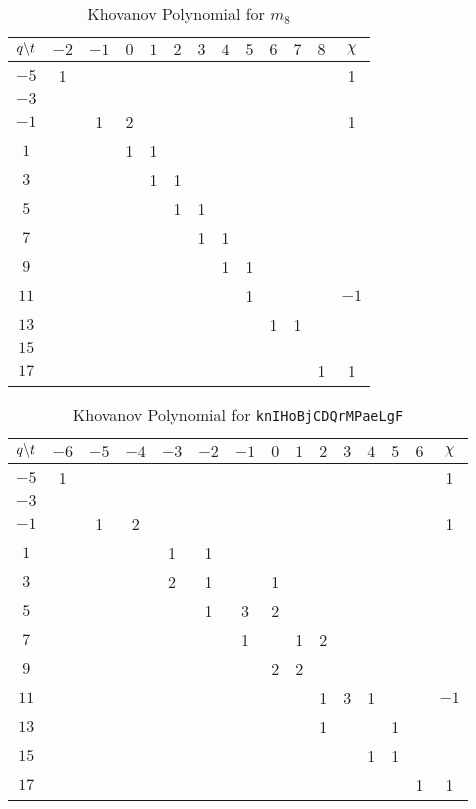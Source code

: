     \begin{table}
        \centering
        \begin{tabular}{| c | c | c | c | c | c | c | c | c | c | c | c | c |}
            \hline
            $q\symbol{92}t$&$-2$&$-1$&$0$&$1$&$2$&$3$&$4$&$5$&$6$&$7$&$8$&$\chi$\\
            \hline
            $-5$&1&&&&&&&&&&&1\\
            \hline
            $-3$&&&&&&&&&&&&\\
            \hline
            $-1$&&1&2&&&&&&&&&1\\
            \hline
            $1$&&&1&1&&&&&&&&\\
            \hline
            $3$&&&&1&1&&&&&&&\\
            \hline
            $5$&&&&&1&1&&&&&&\\
            \hline
            $7$&&&&&&1&1&&&&&\\
            \hline
            $9$&&&&&&&1&1&&&&\\
            \hline
            $11$&&&&&&&&1&&&&$-1$\\
            \hline
            $13$&&&&&&&&&1&1&&\\
            \hline
            $15$&&&&&&&&&&&&\\
            \hline
            $17$&&&&&&&&&&&1&1\\
            \hline
        \end{tabular}
        \caption{Khovanov Polynomial for $m_{8}$}
        \label{table:m_8_kho}
    \end{table}
    \begin{table}
        \centering
        \begin{tabular}{| c | c | c | c | c | c | c | c | c | c | c | c | c | c | c |}
            \hline
            $q\symbol{92}t$&$-6$&$-5$&$-4$&$-3$&$-2$&$-1$&$0$&$1$&$2$&$3$&$4$&$5$&$6$&$\chi$\\
            \hline
            $-5$&1&&&&&&&&&&&&&1\\
            \hline
            $-3$&&&&&&&&&&&&&&\\
            \hline
            $-1$&&1&2&&&&&&&&&&&1\\
            \hline
            $1$&&&&1&1&&&&&&&&&\\
            \hline
            $3$&&&&2&1&&1&&&&&&&\\
            \hline
            $5$&&&&&1&3&2&&&&&&&\\
            \hline
            $7$&&&&&&1&&1&2&&&&&\\
            \hline
            $9$&&&&&&&2&2&&&&&&\\
            \hline
            $11$&&&&&&&&&1&3&1&&&$-1$\\
            \hline
            $13$&&&&&&&&&1&&&1&&\\
            \hline
            $15$&&&&&&&&&&&1&1&&\\
            \hline
            $17$&&&&&&&&&&&&&1&1\\
            \hline
        \end{tabular}
        \caption{Khovanov Polynomial for \texttt{knIHoBjCDQrMPaeLgF}}
        \label{table:knIHoBjCDQrMPaeLgF_kho}
    \end{table}
